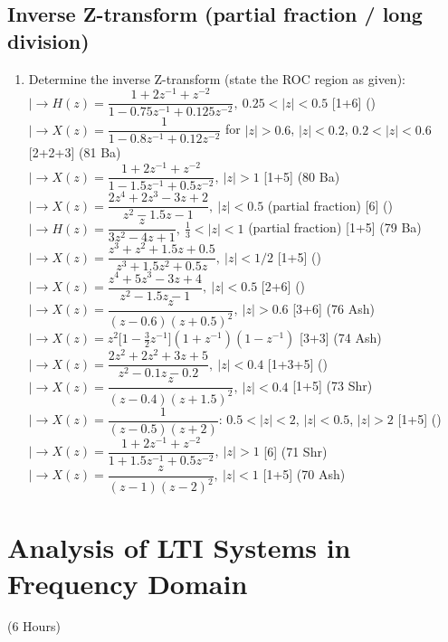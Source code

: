 \documentclass[12pt]{article}
\newcommand{\lb}{\\$\left|\rightarrow\right.$}
\begin{document}
  \subsection{Inverse Z-transform (partial fraction / long division)}
    \begin{enumerate}[topsep=0pt, noitemsep]
      \item Determine the inverse Z-transform (state the ROC region as given):
        \lb $H(z)=\dfrac{1+2z^{-1}+z^{-2}}{1-0.75z^{-1}+0.125z^{-2}},\ 0.25<|z|<0.5$ \hfill [1+6] ()
        \lb $X(z)=\dfrac{1}{1-0.8z^{-1}+0.12z^{-2}}$ for $|z|>0.6$, $|z|<0.2$, $0.2<|z|<0.6$ \hfill [2+2+3] (81 Ba)
        \lb $X(z)=\dfrac{1+2z^{-1}+z^{-2}}{1-1.5z^{-1}+0.5z^{-2}},\ |z|>1$ \hfill [1+5] (80 Ba)
        \lb $X(z)=\dfrac{2z^4+2z^3-3z+2}{z^2-1.5z-1},\ |z|<0.5$ (partial fraction) \hfill [6] ()
        \lb $H(z)=\dfrac{z}{3z^2-4z+1},\ \tfrac13<|z|<1$ (partial fraction) \hfill [1+5] (79 Ba)
        \lb $X(z)=\dfrac{z^3+z^2+1.5z+0.5}{z^3+1.5z^2+0.5z},\ |z|<1/2$ \hfill [1+5] ()
        \lb $X(z)=\dfrac{z^4+5z^3-3z+4}{z^2-1.5z-1},\ |z|<0.5$ \hfill [2+6] ()
        \lb $X(z)=\dfrac{z}{(z-0.6)(z+0.5)^2},\ |z|>0.6$ \hfill [3+6] (76 Ash)
        \lb $X(z)=z^2\big[1-\tfrac32 z^{-1}\big](1+z^{-1})(1-z^{-1})$ \hfill [3+3] (74 Ash)
        \lb $X(z)=\dfrac{2z^2+2z^2+3z+5}{z^2-0.1z-0.2},\ |z|<0.4$ \hfill [1+3+5] ()
        \lb $X(z)=\dfrac{z}{(z-0.4)(z+1.5)^2},\ |z|<0.4$ \hfill [1+5] (73 Shr)
        \lb $X(z)=\dfrac{1}{(z-0.5)(z+2)}$: $0.5<|z|<2$, $|z|<0.5$, $|z|>2$ \hfill [1+5] ()
        \lb $X(z)=\dfrac{1+2z^{-1}+z^{-2}}{1+1.5z^{-1}+0.5z^{-2}},\ |z|>1$ \hfill [6] (71 Shr)
        \lb $X(z)=\dfrac{z}{(z-1)(z-2)^2},\ |z|<1$ \hfill [1+5] (70 Ash)
    \end{enumerate}

\pagebreak
\section{Analysis of LTI Systems in Frequency Domain}
\begin{center}(6 Hours)\end{center}
\end{document}
